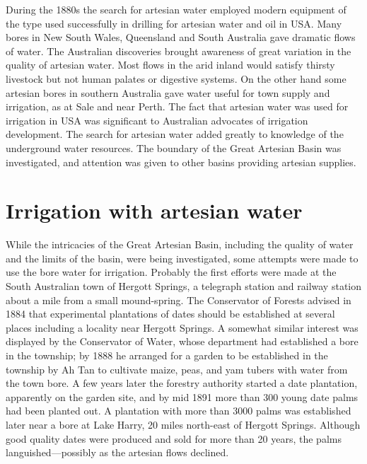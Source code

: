 During the 1880s the search for artesian water employed modern
equipment of the type used successfully in drilling for artesian water
and oil in USA.  Many bores in New South Wales, Queensland
and South Australia gave dramatic flows of water.  The Australian
discoveries brought awareness of great variation in the quality of
artesian water.  Most flows in the arid inland would satisfy thirsty
livestock but not human palates or digestive systems.  On the other
hand some artesian bores in southern Australia gave water useful for
town supply and irrigation, as at Sale and near Perth.  The fact that
artesian water was used for irrigation in USA  was
significant to Australian advocates of irrigation development.  The
search for artesian water added greatly to knowledge of the
underground water resources.  The boundary of the Great Artesian Basin
was investigated, and attention was given to other basins providing
artesian supplies.

\section*{Irrigation with artesian water}

While the intricacies of the Great Artesian Basin, including the
quality of water and the limits of the basin, were being investigated,
some attempts were made to use the bore water for irrigation.
Probably the first efforts were made at the South Australian town of
Hergott Springs,  a telegraph station and
railway station about a mile from a small
mound-spring.   The Conservator of Forests advised
in 1884 that experimental plantations of dates should be established
at several places including a locality near Hergott Springs.  A
somewhat similar interest was displayed by the Conservator of Water,
whose department had established a bore in the township; by 1888 he
arranged for a garden to be established in the
township by Ah Tan  to cultivate maize,
peas, and yam tubers with water from the town bore.
A few years later the forestry authority started a date plantation,
apparently on the garden site, and by mid 1891 more than 300 young
date palms had been planted out.  A plantation with more than 3000
palms was established later near a bore at Lake Harry,
 20 miles north-east of Hergott Springs. Although
good quality dates were produced and sold for more than
20 years, the palms languished---possibly as the artesian flows
declined.


